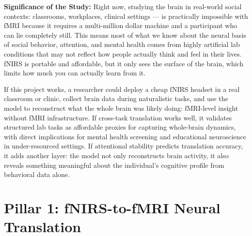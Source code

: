\documentclass[12pt]{article}
\begin{document}
\textbf{Significance of the Study:}
Right now, studying the brain in real-world social contexts: classrooms, workplaces, clinical settings — is practically impossible with fMRI because it requires a multi-million dollar machine and a participant who can lie completely still. This means most of what we know about the neural basis of social behavior, attention, and mental health comes from highly artificial lab conditions that may not reflect how people actually think and feel in their lives. fNIRS is portable and affordable, but it only sees the surface of the brain, which limits how much you can actually learn from it.

If this project works, a researcher could deploy a cheap fNIRS headset in a real classroom or clinic, collect brain data during naturalistic tasks, and use the model to reconstruct what the whole brain was likely doing: fMRI-level insight without fMRI infrastructure. If cross-task translation works well, it validates structured lab tasks as affordable proxies for capturing whole-brain dynamics, with direct implications for mental health screening and educational neuroscience in under-resourced settings. If attentional stability predicts translation accuracy, it adds another layer: the model not only reconstructs brain activity, it also reveals something meaningful about the individual's cognitive profile from behavioral data alone.

\bigskip

\section*{Pillar 1: fNIRS-to-fMRI Neural Translation}
\end{document}
